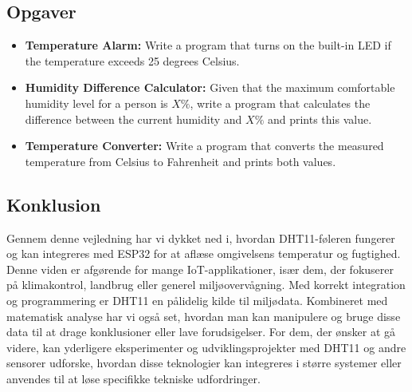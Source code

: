 \subsection*{Opgaver}
\begin{itemize}
	\item \textbf{Temperature Alarm:} Write a program that turns on the built-in LED if the temperature exceeds 25 degrees Celsius.
	\item \textbf{Humidity Difference Calculator:} Given that the maximum comfortable humidity level for a person is \(X\%\), write a program that calculates the difference between the current humidity and \(X\%\) and prints this value.
	\item \textbf{Temperature Converter:} Write a program that converts the measured temperature from Celsius to Fahrenheit and prints both values.
\end{itemize}

\subsection*{Konklusion}
Gennem denne vejledning har vi dykket ned i, hvordan DHT11-føleren fungerer og kan integreres med ESP32 for at aflæse omgivelsens temperatur og fugtighed. Denne viden er afgørende for mange IoT-applikationer, især dem, der fokuserer på klimakontrol, landbrug eller generel miljøovervågning.
\newline\newline\noindent
Med korrekt integration og programmering er DHT11 en pålidelig kilde til miljødata. Kombineret med matematisk analyse har vi også set, hvordan man kan manipulere og bruge disse data til at drage konklusioner eller lave forudsigelser.
\newline\newline\noindent
For dem, der ønsker at gå videre, kan yderligere eksperimenter og udviklingsprojekter med DHT11 og andre sensorer udforske, hvordan disse teknologier kan integreres i større systemer eller anvendes til at løse specifikke tekniske udfordringer.
